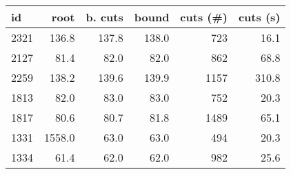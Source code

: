 \begin{tabular}{lrrrrr}
\toprule
   id &   root &  b. cuts &  bound &  cuts (\#) &  cuts (s) \\
\midrule
 2321 &  136.8 &    137.8 &  138.0 &       723 &      16.1 \\
 2127 &   81.4 &     82.0 &   82.0 &       862 &      68.8 \\
 2259 &  138.2 &    139.6 &  139.9 &      1157 &     310.8 \\
 1813 &   82.0 &     83.0 &   83.0 &       752 &      20.3 \\
 1817 &   80.6 &     80.7 &   81.8 &      1489 &      65.1 \\
 1331 & 1558.0 &     63.0 &   63.0 &       494 &      20.3 \\
 1334 &   61.4 &     62.0 &   62.0 &       982 &      25.6 \\
\bottomrule
\end{tabular}
